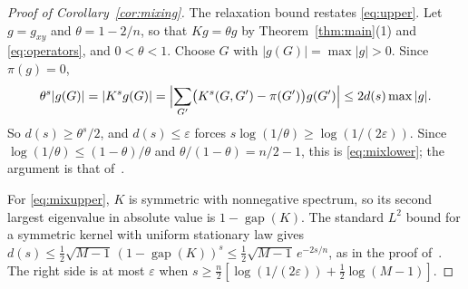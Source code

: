 \begin{proof}[Proof of Corollary~\ref{cor:mixing}]
The relaxation bound restates \eqref{eq:upper}. Let $g=g_{xy}$ and
$\theta=1-2/n$, so that $Kg=\theta g$ by Theorem~\ref{thm:main}(1) and
\eqref{eq:operators}, and $0<\theta<1$. Choose $G$ with
$|g(G)|=\max|g|>0$. Since $\pi(g)=0$,
\[
 \theta^s|g(G)|=|K^sg(G)|
 =\Bigl|\sum_{G'}\bigl(K^s(G,G')-\pi(G')\bigr)g(G')\Bigr|
 \le2d(s)\max|g| .
\]
So $d(s)\ge\theta^s/2$, and $d(s)\le\varepsilon$ forces
$s\log(1/\theta)\ge\log(1/(2\varepsilon))$. Since
$\log(1/\theta)\le(1-\theta)/\theta$ and $\theta/(1-\theta)=n/2-1$, this is
\eqref{eq:mixlower}; the argument is that
of~\cite[Theorem~12.5]{LPW17}.

For \eqref{eq:mixupper}, $K$ is symmetric with nonnegative spectrum, so its
second largest eigenvalue in absolute value is $1-\operatorname{gap}(K)$. The
standard $L^2$ bound for a symmetric kernel with uniform stationary law gives
$d(s)\le\tfrac12\sqrt{M-1}\,(1-\operatorname{gap}(K))^s
\le\tfrac12\sqrt{M-1}\,e^{-2s/n}$, as in the proof
of~\cite[Corollary~1.2]{S26}. The right side is at most $\varepsilon$ when
$s\ge\tfrac n2[\log(1/(2\varepsilon))+\tfrac12\log(M-1)]$.
\end{proof}
